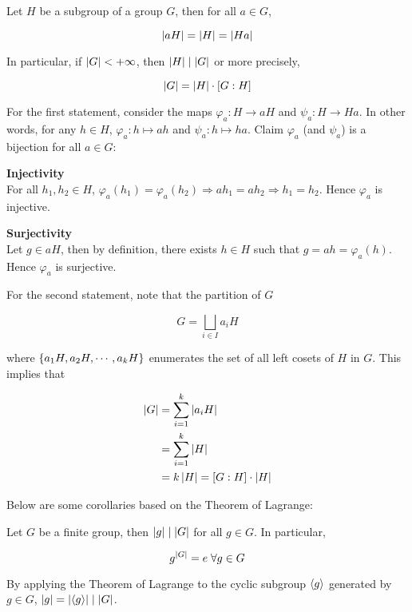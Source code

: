 \documentclass[a4paper,12pt]{article}
\begin{document}
\begin{thm}
  Let $H$ be a subgroup of a group $G$, then for all $a\in G$,

  $$\left| aH\right|=\left| H\right|=\left| Ha\right|$$\s

  In particular, if $\left| G\right|<+\infty$, then $\left| H\right|\mid\left| G\right|$ or more precisely,

  $$\left| G\right|=\left| H\right|\cdot[G:H]$$\s

  \prf For the first statement, consider the maps $\varphi_{a}:H\to aH$ and $\psi_{a}:H\to Ha$. In other words, for any $h\in H$, $\varphi_{a}:h\mapsto ah$ and $\psi_{a}:h\mapsto ha$. Claim $\varphi_{a}$ (and $\psi_{a}$) is a bijection for all $a\in G$:

  \begin{alist}
    \item \textbf{Injectivity}\\
    For all $h_{1},h_{2}\in H$, $\varphi_{a}(h_{1})=\varphi_{a}(h_{2})\Rightarrow ah_{1}=ah_{2}\Rightarrow h_{1}=h_{2}$. Hence $\varphi_{a}$ is injective.
    \item \textbf{Surjectivity}\\
    Let $g\in aH$, then by definition, there exists $h\in H$ such that $g=ah=\varphi_{a}(h)$. Hence $\varphi_{a}$ is surjective.
  \end{alist}

  For the second statement, note that the partition of $G$

  $$G=\bigsqcup_{i\in I}a_{i}H$$\s

  where $\left\{ a_{1}H,a_{2}H,\cdots,a_{k}H\right\}$ enumerates the set of all left cosets of $H$ in $G$. This implies that

  $$\begin{aligned}[t]
    \left| G\right|&=\sum_{i=1}^{k}\left| a_{i}H\right|\\
    &=\sum_{i=1}^{k}\left| H\right|\\
    &=k\left| H\right|=[G:H]\cdot\left| H\right|
  \end{aligned}$$
\end{thm}\n

Below are some corollaries based on the Theorem of Lagrange:\n

\begin{crl}
  Let $G$ be a finite group, then $\left| g\right|\mid\left| G\right|$ for all $g\in G$. In particular,

  $$g^{\left| G\right|}=e\;\forall g\in G$$\s

  \prf By applying the Theorem of Lagrange to the cyclic subgroup $\left\langle g\right\rangle$ generated by $g\in G$, $\left| g\right|=\left| \left\langle g\right\rangle\right|\mid\left| G\right|$.
\end{crl}\n
\end{document}

